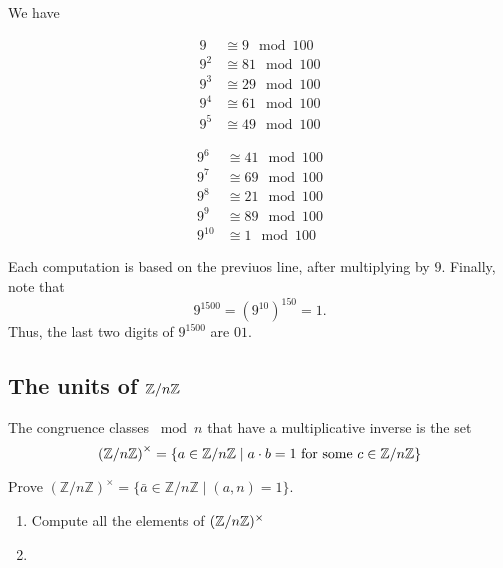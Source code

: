 \documentclass[11pt,a4paper]{article}
\begin{document}
We have  
\vspace{-\baselineskip}
\begin{center}
    \begin{minipage}{0.3\linewidth}
        \begin{align*}
            9 &\cong 9 \mod 100\\
            9^2 &\cong 81 \mod 100\\
            9^3 &\cong 29 \mod 100\\
            9^4 &\cong 61 \mod 100\\
            9^5 &\cong 49 \mod 100
        \end{align*}
        \end{minipage}
        \begin{minipage}{0.3\linewidth}
        \begin{align*}
            9^6 &\cong 41 \mod 100\\
            9^7 &\cong 69 \mod 100\\
            9^8 &\cong 21 \mod 100\\
            9^9 &\cong 89 \mod 100\\
            9^{10} &\cong 1 \mod 100
        \end{align*}
    \end{minipage}
\end{center}
    

Each computation is based on the previuos line, after  multiplying by \(9\).
Finally, note that \[9^{1500} = (9^{10})^{150} = 1.\]
Thus, the last two digits of \(9^{1500}\) are \(01\).


\subsection{The units of \(\mathbb{Z}/n \mathbb{Z}\)}

The congruence classes \(\bmod n\) that have a multiplicative inverse is the set
\[\left( \mathbb{Z}/n \mathbb{Z} \right)^\times = \left\{ a\in  \mathbb{Z}/n \mathbb{Z} \mid a\cdot b = 1 \text{ for some } c\in \mathbb{Z}/n \mathbb{Z} \right\}\]

\begin{eje}
    Prove \((\mathbb{Z} / n \mathbb{Z})^{\times}=\{\bar{a} \in \mathbb{Z} / n \mathbb{Z} \mid(a, n)=1\}\).
\end{eje}

\begin{eje}
    \begin{enumerate}[label=(\roman*)]
        \item Compute all the elements of \((\mathbb{Z}/n \mathbb{Z})^\times\)
        \item 
    \end{enumerate}
    
\end{eje}
\end{document}
